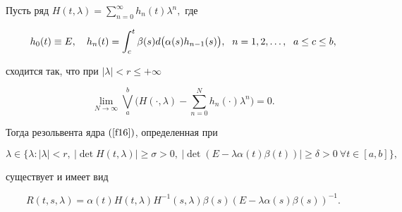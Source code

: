 \begin{thm}


Пусть ряд $H(t,\lambda)=\sum\limits_{n=0}^\infty


h_n(t)\lambda^n,$ где


\begin{equation}\label{f17}


h_0(t)\equiv E,\quad h_n(t)=\integral{c}{t}\beta(s)d\big(\alpha(s)


h_{n-1}(s)\big),\ \; n=1,2,\dotsc,\ \; a\leq c\leq b,


\end{equation}


сходится так, что при $|\lambda|<r\leq+\infty$ 


$$


\lim_{N\to\infty}\bigvee_a^b\bigg(H(\cdot,\lambda)-\sum_{n=0}^N


h_n(\cdot)\lambda^n\bigg)=0.


$$


Тогда резольвента ядра $(\ref{f16})$, определенная при


$$


\lambda\in\big\{\lambda:|\lambda|<r,\ |


\det H(t,\lambda)|\geq\sigma>0,


\ |\det(E-\lambda\alpha(t)\beta(t))|\geq\delta>0


\ \forall t\in[a,b]\big\},


$$


существует и имеет вид


\begin{equation}\label{f19}


R(t,s,\lambda)=\alpha(t)H(t,\lambda)H^{-1}(s,\lambda)\beta(s)


(E-\lambda\alpha(s)\beta(s))^{-1}.


\end{equation}


\end{thm}





